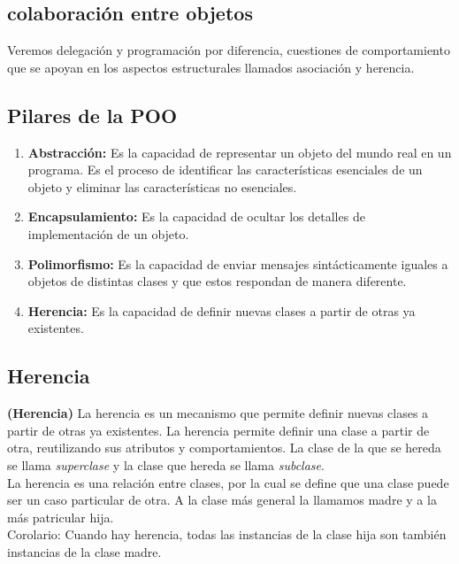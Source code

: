 \documentclass[../main.tex]{subfiles}
\begin{document}
    \subsection{colaboración entre objetos}
        Veremos delegación y programación por diferencia, cuestiones de comportamiento que se apoyan en los aspectos estructurales llamados asociación y herencia. 

    \subsection{Pilares de la POO}          
        \begin{enumerate}
            \item \textbf{Abstracción:} Es la capacidad de representar un objeto del mundo real en un programa. Es el proceso de identificar las características esenciales de un objeto y eliminar las características no esenciales.
            \item \textbf{Encapsulamiento:} Es la capacidad de ocultar los detalles de implementación de un objeto.
            \item \textbf{Polimorfismo:} Es la capacidad de enviar mensajes sintácticamente iguales a objetos de distintas clases y que estos respondan de manera diferente.
            \item \textbf{Herencia:} Es la capacidad de definir nuevas clases a partir de otras ya existentes.
        \end{enumerate}
    
    \subsection{Herencia}   
        \begin{definition} \textbf{(Herencia)}
            La herencia es un mecanismo que permite definir nuevas clases a partir de otras ya existentes. La herencia permite definir una clase a partir de otra, reutilizando sus atributos y comportamientos. La clase de la que se hereda se llama \textit{superclase} y la clase que hereda se llama \textit{subclase}.\\

            La herencia es una relación entre clases, por la cual se define que una clase puede ser un caso particular de otra. A la clase más general la llamamos madre y a la más patricular hija.\\

            Corolario: Cuando hay herencia, todas las instancias de la clase hija son también instancias de la clase madre.
        \end{definition}
\end{document}
